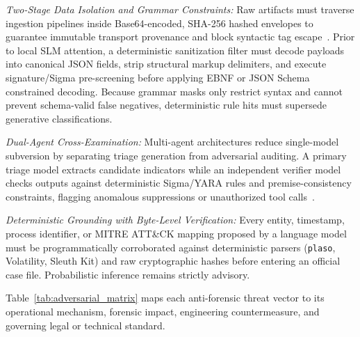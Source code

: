 \textit{Two-Stage Data Isolation and Grammar Constraints:} Raw artifacts must traverse ingestion pipelines inside Base64-encoded, SHA-256 hashed envelopes to guarantee immutable transport provenance and block syntactic tag escape~\cite{sharma2025_forensicllm}. Prior to local SLM attention, a deterministic sanitization filter must decode payloads into canonical JSON fields, strip structural markup delimiters, and execute signature/Sigma pre-screening before applying EBNF or JSON Schema constrained decoding. Because grammar masks only restrict syntax and cannot prevent schema-valid false negatives, deterministic rule hits must supersede generative classifications.

\textit{Dual-Agent Cross-Examination:} Multi-agent architectures reduce single-model subversion by separating triage generation from adversarial auditing. A primary triage model extracts candidate indicators while an independent verifier model checks outputs against deterministic Sigma/YARA rules and premise-consistency constraints, flagging anomalous suppressions or unauthorized tool calls~\cite{liu2025_autobnb, ozyurt2026_llmorchestrated, hammar2026_a}.

\textit{Deterministic Grounding with Byte-Level Verification:} Every entity, timestamp, process identifier, or MITRE ATT\&CK mapping proposed by a language model must be programmatically corroborated against deterministic parsers (\texttt{plaso}, Volatility, Sleuth Kit) and raw cryptographic hashes before entering an official case file. Probabilistic inference remains strictly advisory.

Table~\ref{tab:adversarial_matrix} maps each anti-forensic threat vector to its operational mechanism, forensic impact, engineering countermeasure, and governing legal or technical standard.

